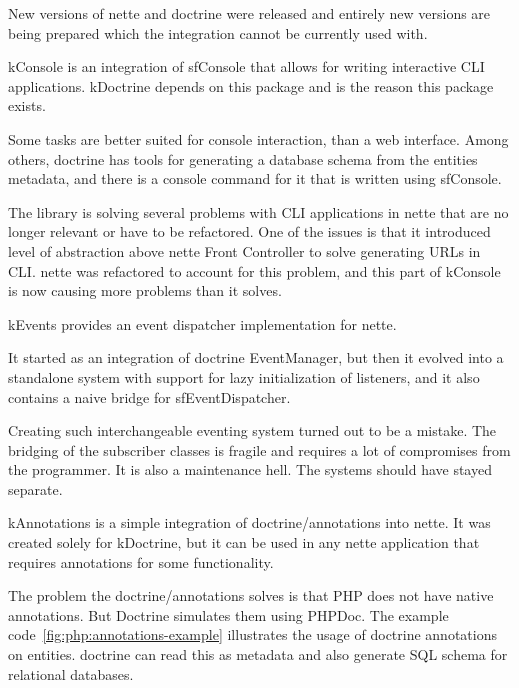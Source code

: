 New versions of \gls{nette} and \gls{doctrine} were released and entirely new versions are being prepared which the integration cannot be currently used with.

 \label{sec:state:console}

\gls{kConsole} is an integration of \gls{sfConsole} that allows for writing interactive CLI applications. \gls{kDoctrine} depends on this package and is the reason this package exists.

Some tasks are better suited for console interaction, than a web interface. Among others, \gls{doctrine} has tools for generating a database schema from the entities metadata, and there is a console command for it that is written using \gls{sfConsole}.

The library is solving several problems with CLI applications in \gls{nette} that are no longer relevant or have to be refactored. One of the issues is that it introduced level of abstraction above \gls{nette} Front Controller to solve generating URLs in CLI. \gls{nette} was refactored to account for this problem, and this part of \gls{kConsole} is now causing more problems than it solves.

 \label{sec:state:events}

\gls{kEvents} provides an event dispatcher implementation for \gls{nette}.

It started as an integration of \gls{doctrine} EventManager, but then it evolved into a standalone system with support for lazy initialization of listeners, and it also contains a naive bridge for \gls{sfEventDispatcher}.

Creating such interchangeable eventing system turned out to be a mistake. The bridging of the subscriber classes is fragile and requires a lot of compromises from the programmer. It is also a maintenance hell. The systems should have stayed separate.

 \label{sec:state:annotations}

\gls{kAnnotations} is a simple integration of doctrine/annotations into \gls{nette}. It was created solely for \gls{kDoctrine}, but it can be used in any \gls{nette} application that requires annotations for some functionality.

The problem the doctrine/annotations solves is that PHP does not have native annotations. But Doctrine simulates them using PHPDoc. The example code~\ref{fig:php:annotations-example} illustrates the usage of \gls{doctrine} annotations on entities. \gls{doctrine} can read this as metadata and also generate SQL schema for relational databases.


